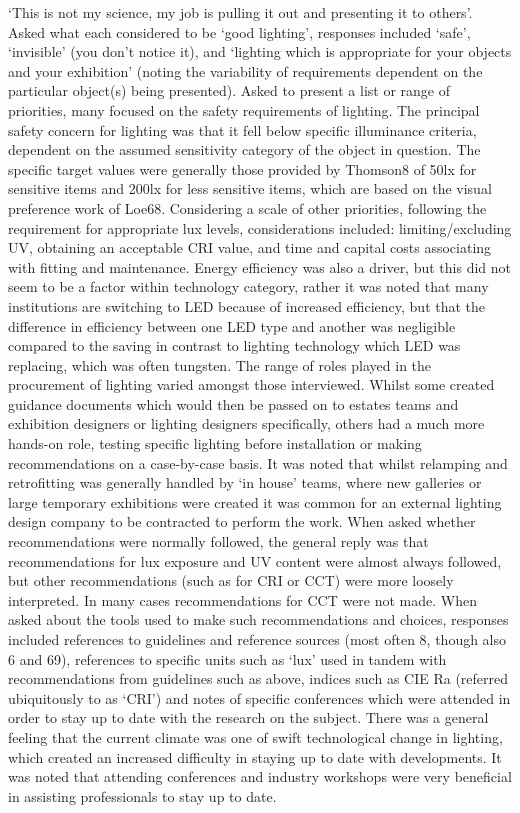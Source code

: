 `This is not my science, my job is pulling it out and presenting it to others'.
Asked what each considered to be `good lighting', responses included `safe', `invisible' (you don't notice it), and `lighting which is appropriate for your objects and your exhibition' (noting the variability of requirements dependent on the particular object(s) being presented). Asked to present a list or range of priorities, many focused on the safety requirements of lighting. The principal safety concern for lighting was that it fell below specific illuminance criteria, dependent on the assumed sensitivity category of the object in question. The specific target values were generally those provided by Thomson8 of 50lx for sensitive items and 200lx for less sensitive items, which are based on the visual preference work of Loe68.
Considering a scale of other priorities, following the requirement for appropriate lux levels, considerations included: limiting/excluding UV, obtaining an acceptable CRI value, and time and capital costs associating with fitting and maintenance. Energy efficiency was also a driver, but this did not seem to be a factor within technology category, rather it was noted that many institutions are switching to LED because of increased efficiency, but that the difference in efficiency between one LED type and another was negligible compared to the saving in contrast to lighting technology which LED was replacing, which was often tungsten.
The range of roles played in the procurement of lighting varied amongst those interviewed. Whilst some created guidance documents which would then be passed on to estates teams and exhibition designers or lighting designers specifically, others had a much more hands-on role, testing specific lighting before installation or making recommendations on a case-by-case basis. It was noted that whilst relamping and retrofitting was generally handled by `in house' teams, where new galleries or large temporary exhibitions were created it was common for an external lighting design company to be contracted to perform the work. When asked whether recommendations were normally followed, the general reply was that recommendations for lux exposure and UV content were almost always followed, but other recommendations (such as for CRI or \gls{CCT}) were more loosely interpreted. In many cases recommendations for \gls{CCT} were not made.
When asked about the tools used to make such recommendations and choices, responses included references to guidelines and reference sources (most often 8, though also 6 and 69), references to specific units such as `lux' used in tandem with recommendations from guidelines such as above, indices such as CIE Ra (referred ubiquitously to as `CRI') and notes of specific conferences which were attended in order to stay up to date with the research on the subject. There was a general feeling that the current climate was one of swift technological change in lighting, which created an increased difficulty in staying up to date with developments. It was noted that attending conferences and industry workshops were very beneficial in assisting professionals to stay up to date. 
